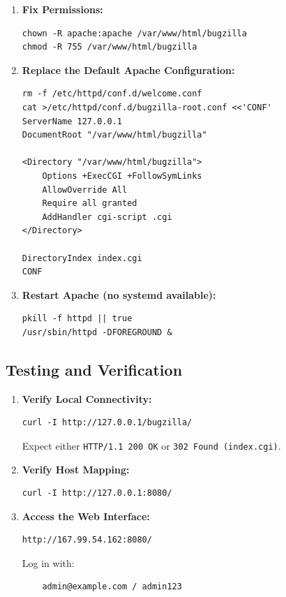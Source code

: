 \begin{enumerate}
    \item \textbf{Fix Permissions:}

    \begin{verbatim}
chown -R apache:apache /var/www/html/bugzilla
chmod -R 755 /var/www/html/bugzilla
    \end{verbatim}

    \item \textbf{Replace the Default Apache Configuration:}

    \begin{verbatim}
rm -f /etc/httpd/conf.d/welcome.conf
cat >/etc/httpd/conf.d/bugzilla-root.conf <<'CONF'
ServerName 127.0.0.1
DocumentRoot "/var/www/html/bugzilla"

<Directory "/var/www/html/bugzilla">
    Options +ExecCGI +FollowSymLinks
    AllowOverride All
    Require all granted
    AddHandler cgi-script .cgi
</Directory>

DirectoryIndex index.cgi
CONF
    \end{verbatim}

    \item \textbf{Restart Apache (no systemd available):}

    \begin{verbatim}
pkill -f httpd || true
/usr/sbin/httpd -DFOREGROUND &
    \end{verbatim}
\end{enumerate}

\subsection{Testing and Verification}

\begin{enumerate}
    \item \textbf{Verify Local Connectivity:}

    \begin{verbatim}
curl -I http://127.0.0.1/bugzilla/
    \end{verbatim}

    Expect either \texttt{HTTP/1.1 200 OK} or \texttt{302 Found (index.cgi)}.

    \item \textbf{Verify Host Mapping:}

    \begin{verbatim}
curl -I http://127.0.0.1:8080/
    \end{verbatim}

    \item \textbf{Access the Web Interface:}

    \begin{verbatim}
http://167.99.54.162:8080/
    \end{verbatim}

    Log in with:
    \begin{verbatim}
    admin@example.com / admin123
    \end{verbatim}
\end{enumerate}

